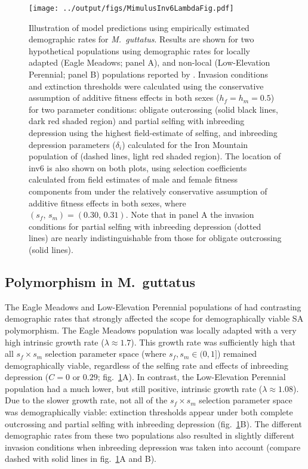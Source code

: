 \documentclass[11pt]{article}
\begin{document}
\begin{figure}[htbp]
 \centering
 \texttt{[image: ../output/figs/MimulusInv6LambdaFig.pdf]}
 \caption{\footnotesize{Illustration of model predictions using empirically estimated demographic rates for {\itshape M.~guttatus}. Results are shown for two hypothetical populations using demographic rates for locally adapted (Eagle Meadows; panel A), and non-local (Low-Elevation Perennial; panel B) populations reported by \citet{PetersonEtAl2016}. Invasion conditions and extinction thresholds were calculated using the conservative assumption of additive fitness effects in both sexes ($h_f = h_m = 0.5$) for two parameter conditions: obligate outcrossing (solid black lines, dark red shaded region)  and partial selfing with inbreeding depression using the highest field-estimate of selfing, and inbreeding depression parameters ($\delta_i$) calculated for the Iron Mountain population of \citet{Willis1993} (dashed lines, light red shaded region). The location of inv6 is also shown on both plots, using selection coefficients calculated from field estimates of male and female fitness components from \citet{LeeKelly2015} under the relatively conservative assumption of additive fitness effects in both sexes, where $(s_f,\,s_m) = (0.30,\, 0.31)$. Note that in panel A the invasion conditions for partial selfing with inbreeding depression (dotted lines) are nearly indistinguishable from those for obligate outcrossing (solid lines).}} 
 \label{fig:mimulusFig}
 \end{figure}

\subsection*{Polymorphism in M.~guttatus} \label{sec:Mgutt}

The Eagle Meadows and Low-Elevation Perennial populations of \citet{PetersonEtAl2016} had contrasting demographic rates that strongly affected the scope for demographically viable SA polymorphism. The Eagle Meadows population was locally adapted with a very high intrinsic growth rate ($\lambda \approx 1.7$). This growth rate was sufficiently high that all $s_f \times s_m$ selection parameter space (where $s_f, s_m \in (0,1]$) remained demographically viable, regardless of the selfing rate and effects of inbreeding depression ($C = 0$ or $0.29$; fig.~\ref{fig:mimulusFig}A). In contrast, the Low-Elevation Perennial population had a much lower, but still positive, intrinsic growth rate ($\lambda \approx 1.08$). Due to the slower growth rate, not all of the $s_f \times s_m$ selection parameter space was demographically viable: extinction thresholds appear under both complete outcrossing and partial selfing with inbreeding depression (fig.~\ref{fig:mimulusFig}B). The different demographic rates from these two populations also resulted in slightly different invasion conditions when inbreeding depression was taken into account (compare dashed with solid lines in fig.~\ref{fig:mimulusFig}A and B).
\end{document}
